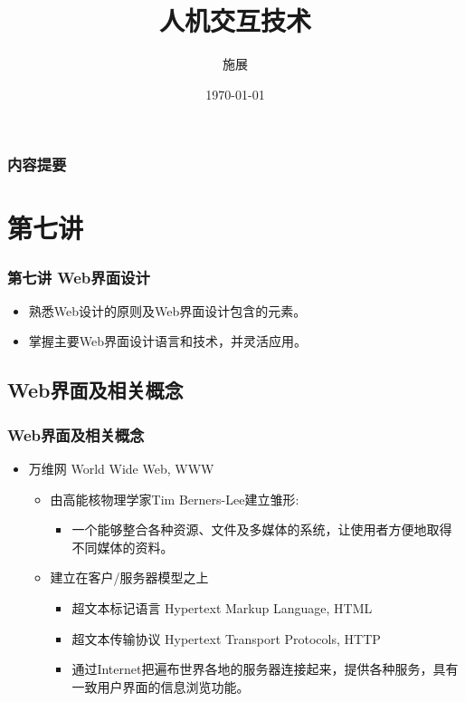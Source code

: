 \documentclass{beamer}
\title{人机交互技术}
\author{施展}
\institute{华中科技大学~武汉光电国家实验室}
\date{\today}
\begin{document}
\begin{frame}
	\titlepage
\end{frame}

\begin{frame}
	\frametitle{内容提要}
	\tableofcontents
\end{frame}

\section{第七讲}
\begin{frame}
	\frametitle{第七讲 Web界面设计}
	\begin{itemize}
		\item 熟悉Web设计的原则及Web界面设计包含的元素。
		\item 掌握主要Web界面设计语言和技术，并灵活应用。
	\end{itemize}
\end{frame}

\subsection{Web界面及相关概念}
\begin{frame}
	\frametitle{Web界面及相关概念}
	\beamertemplatetransparentcovereddynamicmedium
	\begin{itemize}[<+->]
		\item 万维网 World Wide Web, WWW
		\begin{itemize}
			\item 由高能核物理学家Tim Berners-Lee建立雏形:
			\begin{itemize}
				\item 一个能够整合各种资源、文件及多媒体的系统，让使用者方便地取得不同媒体的资料。
			\end{itemize}
			\item 建立在客户/服务器模型之上
			\begin{itemize}
				\item 超文本标记语言 Hypertext Markup Language, HTML~\cite{berners1995hypertext}
				\item 超文本传输协议 Hypertext Transport Protocols, HTTP~\cite{fielding1999hypertext}
				\item 通过Internet把遍布世界各地的服务器连接起来，提供各种服务，具有一致用户界面的信息浏览功能。
			\end{itemize}
		\end{itemize}
	\end{itemize}
\end{frame}
\end{document}
